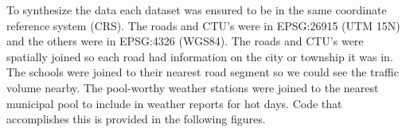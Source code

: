 \documentclass[article,12pt]{article}
\numberwithin{equation}{section}
\begin{document}
To synthesize the data each dataset was ensured to be in the same coordinate reference system (CRS). The roads and CTU's were in EPSG:26915 (UTM 15N) and the others were in EPSG:4326 (WGS84). The roads and CTU's were spatially joined so each road had information on the city or township it was in. The schools were joined to their nearest road segment so we could see the traffic volume nearby. The pool-worthy weather stations were joined to the nearest municipal pool to include in weather reports for hot days. Code that accomplishes this is provided in the following figures.

\begin{adjustwidth}{-.7in}{-.7in}
	\\
\end{adjustwidth}
\end{document}
